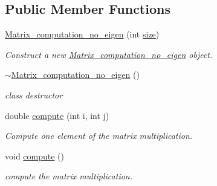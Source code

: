 \subsection*{Public Member Functions}
\begin{DoxyCompactItemize}
\item 
\hyperlink{classMatrix__computation__no__eigen_af70d9fcfdc0c9a9b755a9261211dce8a}{Matrix\+\_\+computation\+\_\+no\+\_\+eigen} (int \hyperlink{classMatrix__computation__no__eigen_a1f73cf9e7670c6a78a64cb8977f2dcc6}{size})
\begin{DoxyCompactList}\small\item\em Construct a new \hyperlink{classMatrix__computation__no__eigen}{Matrix\+\_\+computation\+\_\+no\+\_\+eigen} object. \end{DoxyCompactList}\item 
\mbox{\label{classMatrix__computation__no__eigen_a47f33ea53cf14f1c6b86218203c8af26}} 
\hyperlink{classMatrix__computation__no__eigen_a47f33ea53cf14f1c6b86218203c8af26}{$\sim$\+Matrix\+\_\+computation\+\_\+no\+\_\+eigen} ()
\begin{DoxyCompactList}\small\item\em class destructor \end{DoxyCompactList}\item 
double \hyperlink{classMatrix__computation__no__eigen_a588b833136c503e9726d7276f358f117}{compute} (int i, int j)
\begin{DoxyCompactList}\small\item\em Compute one element of the matrix multiplication. \end{DoxyCompactList}\item 
void \hyperlink{classMatrix__computation__no__eigen_a7fbc5e6986b2f630e8356e4d276aa03e}{compute} ()
\begin{DoxyCompactList}\small\item\em compute the matrix multiplication. \end{DoxyCompactList}\end{DoxyCompactItemize}
